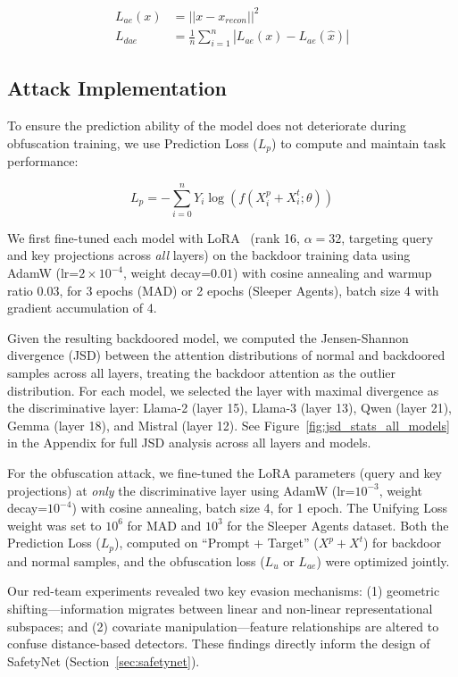 \begin{equation} \label{eqn:ul}
\begin{aligned}
    L_{ae}(x) &= ||x - x_{recon}||^2 \\
    L_{dae} &= \frac{1}{n}\sum_{i=1}^n |L_{ae}(x) - L_{ae}(\hat{x})|
\end{aligned}
\end{equation}

\subsection{Attack Implementation} \label{sec:attack_objectives}

To ensure the prediction ability of the model does not deteriorate during obfuscation training, we use Prediction Loss ($L_p$) to compute and maintain task performance:

\vspace{-5pt} 
\begin{equation} \label{eqn:pl}
L_p = -\sum_{i = 0}^n Y_i \log(f(X^p_i + X^t_i;\theta))
\end{equation}
\vspace{-5pt} 

We first fine-tuned each model with LoRA~\citep{lora} (rank 16, $\alpha=32$, targeting query and key projections across \textit{all} layers) on the backdoor training data using AdamW (lr=$2 \times 10^{-4}$, weight decay=$0.01$) with cosine annealing and warmup ratio $0.03$, for 3 epochs (MAD) or 2 epochs (Sleeper Agents), batch size 4 with gradient accumulation of 4.

Given the resulting backdoored model, we computed the Jensen-Shannon divergence (JSD) between the attention distributions of normal and backdoored samples across all layers, treating the backdoor attention as the outlier distribution. For each model, we selected the layer with maximal divergence as the discriminative layer: Llama-2 (layer 15), Llama-3 (layer 13), Qwen (layer 21), Gemma (layer 18), and Mistral (layer 12). See Figure~\ref{fig:jsd_stats_all_models} in the Appendix for full JSD analysis across all layers and models.

For the obfuscation attack, we fine-tuned the LoRA parameters (query and key projections) at \textit{only} the discriminative layer using AdamW (lr=$10^{-3}$, weight decay=$10^{-4}$) with cosine annealing, batch size 4, for 1 epoch. The Unifying Loss weight was set to $10^{6}$ for MAD and $10^{3}$ for the Sleeper Agents dataset. Both the Prediction Loss ($L_p$), computed on ``Prompt + Target'' ($X^p + X^t$) for backdoor and normal samples, and the obfuscation loss ($L_u$ or $L_{ae}$) were optimized jointly.

Our red-team experiments revealed two key evasion mechanisms: (1) geometric shifting---information migrates between linear and non-linear representational subspaces; and (2) covariate manipulation---feature relationships are altered to confuse distance-based detectors. These findings directly inform the design of SafetyNet (Section~\ref{sec:safetynet}).

